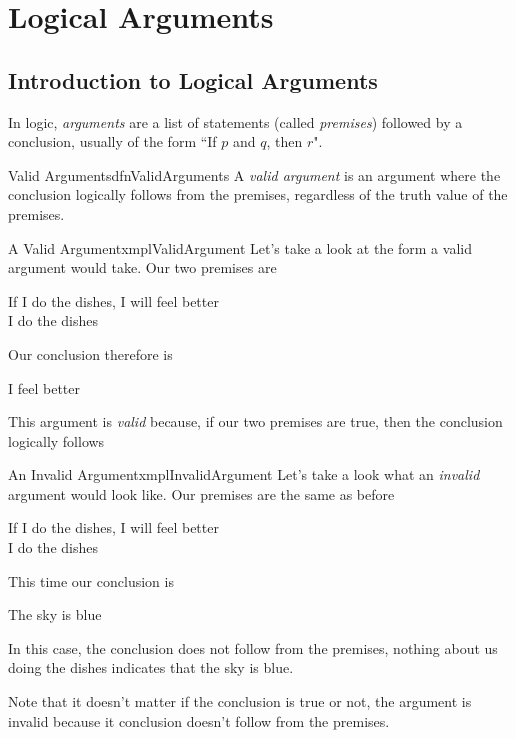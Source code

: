 \chapter{Logical Arguments}

\section{Introduction to Logical Arguments}
In logic, \emph{arguments} are a list of statements (called \emph{premises}) followed by a conclusion, usually of the form ``If $p$ and $q$, then $r$".

\begin{dfn}[label={def:validArguments}]{Valid Arguments}{dfnValidArguments}
    A \emph{valid argument} is an argument where the conclusion logically follows from the premises, regardless of the truth value of the premises.
\end{dfn}

\begin{exmpl}[label={exmpl:validArgument}]{A Valid Argument}{xmplValidArgument}
    Let's take a look at the form a valid argument would take. Our two premises are
    \begin{center}
        If I do the dishes, I will feel better\\
        I do the dishes
    \end{center}
    Our conclusion therefore is
    \begin{center}
        I feel better
    \end{center}
    This argument is \emph{valid} because, if our two premises are true, then the conclusion logically follows
\end{exmpl}

\begin{exmpl}[label={exmpl:invalidArgument}]{An Invalid Argument}{xmplInvalidArgument}
    Let's take a look what an \emph{invalid} argument would look like. Our premises are the same as before
    \begin{center}
        If I do the dishes, I will feel better\\
        I do the dishes
    \end{center}
    This time our conclusion is
    \begin{center}
        The sky is blue
    \end{center}
    In this case, the conclusion does not follow from the premises, nothing about us doing the dishes indicates that the sky is blue.

    Note that it doesn't matter if the conclusion is true or not, the argument is invalid because it conclusion doesn't follow from the premises.
\end{exmpl}

